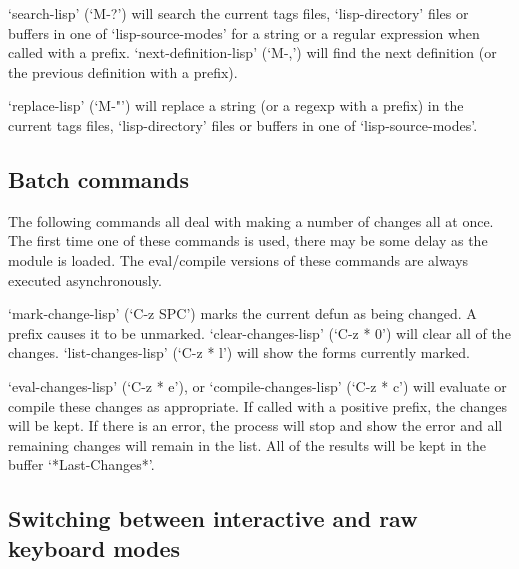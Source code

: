 \shortsubsection{}

`search-lisp' (`M-?') will search the current tags files,
`lisp-directory' files or buffers in one of `lisp-source-modes' for a
string or a regular expression when called with a prefix.
`next-definition-lisp' (`M-,') will find the next definition (or the
previous definition with a prefix).

\shortsubsection{}

`replace-lisp' (`M-"') will replace a string (or a regexp with a
prefix) in the current tags files, `lisp-directory' files or buffers in
one of `lisp-source-modes'.




\subsection{Batch commands}

The following commands all deal with making a number of changes all 
at once. The first time one of these commands is used, there may be 
some delay as the module is loaded. The eval/compile versions of these 
commands are always executed asynchronously.

 `mark-change-lisp' (`C-z SPC') marks the current defun as being
changed.  A prefix causes it to be unmarked.  `clear-changes-lisp'
(`C-z * 0') will clear all of the changes.  `list-changes-lisp' (`C-z *
l') will show the forms currently marked.

`eval-changes-lisp' (`C-z * e'), or `compile-changes-lisp' (`C-z *
c') will evaluate or compile these changes as appropriate.  If called
with a positive prefix, the changes will be kept.  If there is an
error, the process will stop and show the error and all remaining
changes will remain in the list.  All of the results will be kept in
the buffer `*Last-Changes*'.


\subsection{Switching between interactive and raw keyboard modes}

